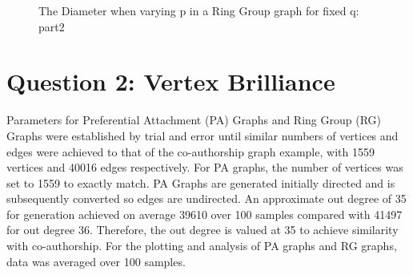 \documentclass[12pt,a4paper]{article}
\begin{document}
\begin{figure}[h]
	\qquad
	\qquad
	\caption{The Diameter when varying p in a Ring Group graph for fixed q: part2}
	\label{diameters}
\end{figure}

\newpage
\section{Question 2: Vertex Brilliance}
Parameters for Preferential Attachment (PA) Graphs and Ring Group (RG) Graphs were established by trial and error until similar numbers of vertices and edges were achieved to that of the co-authorship graph example, with 1559 vertices and 40016 edges respectively. For PA graphs, the number of vertices was set to 1559 to exactly match. PA Graphs are generated initially directed and is subsequently converted so edges are undirected. An approximate out degree of 35 for generation achieved on average 39610 over 100 samples compared with 41497 for out degree 36. Therefore, the out degree is valued at 35 to achieve similarity with co-authorship. For the plotting and analysis of PA graphs and RG graphs, data was averaged over 100 samples.
\end{document}
